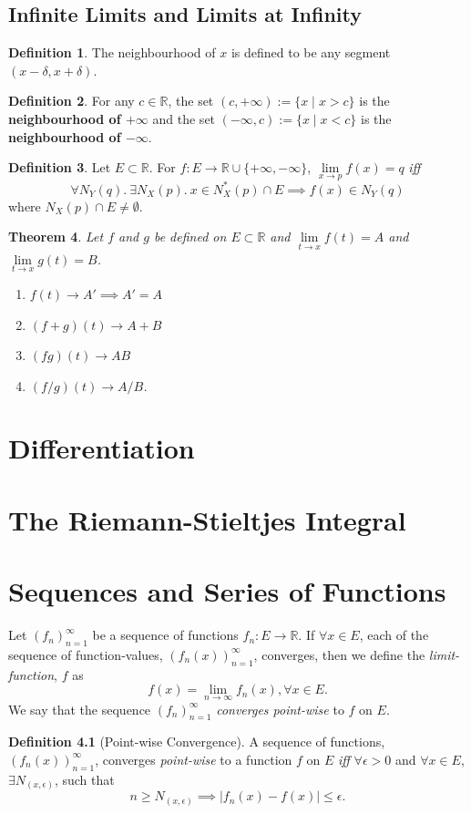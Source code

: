 \documentclass[a4paper,12pt]{report}
\newcommand{\R}{\mathbb{R}}
\newcommand{\tb}{\textbf}
\theoremstyle{plain}
\newtheorem{theorem}{\color{blue}Theorem}[chapter] %
\theoremstyle{definition}
\newtheorem{definition}[theorem]{\color{red}Definition} %
\theoremstyle{remark}
\begin{document}
\section{Infinite Limits and Limits at Infinity}
\begin{definition}
The neighbourhood of $x$ is defined to be any segment $(x-\delta,x+\delta)$.
\end{definition}
\begin{definition} For any $c\in\R$, the set $(c,+\infty):=\{x\mid x>c\}$ is the \tb{neighbourhood of $+\infty$} and the set $(-\infty,c):=\{x\mid x<c\}$ is the \tb{neighbourhood of $-\infty$}.
\end{definition}
\begin{definition} Let $E\subset \R$. For $f:E\to \R\cup\{+\infty,-\infty\}$, $\lim\limits_{x\to p}f(x)=q$ \emph{iff}
\[
\forall N_Y(q).\:\exists N_X(p).\:x\in N_X^*(p)\cap E\implies f(x)\in N_Y(q)
\]
where $N_X(p)\cap E\neq\emptyset$.
\end{definition}
\begin{theorem}
Let $f$ and $g$ be defined on $E\subset\R$ and $\lim\limits_{t\to x}f(t)=A$ and $\lim\limits_{t\to x}g(t)=B$.
\begin{enumerate}
\item $f(t)\to A'\implies A'=A$
\item $(f+g)(t)\to A+B$
\item $(fg)(t)\to AB$
\item $(f/g)(t)\to A/B$.
\end{enumerate}
\end{theorem}

\chapter{Differentiation}
\chapter{The Riemann-Stieltjes Integral}
\chapter{Sequences and Series of Functions}
Let $(f_n)_{n=1}^\infty$ be a sequence of functions $f_n:E\to\R$. If $\forall x\in E$, each of the sequence of function-values, $(f_n(x))_{n=1}^\infty$, converges, then we define the \emph{limit-function}, $f$ as \[f(x)=\lim_{n\to\infty} f_n(x), \forall x\in E.\]
We say that the sequence $(f_n)_{n=1}^\infty$ \emph{converges point-wise} to $f$ on $E$.
\begin{definition}[Point-wise Convergence]
A sequence of functions, $(f_n(x))_{n=1}^\infty$, converges \emph{point-wise} to a function $f$ on $E$ \emph{iff} $\forall\epsilon>0$ and $\forall x\in E$, $\exists N_{(x,\epsilon)}$, such that  
\[n\ge N_{(x,\epsilon)}\implies |f_n(x)-f(x)|\le\epsilon.\]
\end{definition}
\end{document}

